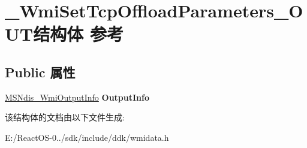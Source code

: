 \hypertarget{struct___wmi_set_tcp_offload_parameters___o_u_t}{}\section{\+\_\+\+Wmi\+Set\+Tcp\+Offload\+Parameters\+\_\+\+O\+U\+T结构体 参考}
\label{struct___wmi_set_tcp_offload_parameters___o_u_t}
\subsection*{Public 属性}
\begin{DoxyCompactItemize}
\item 
\mbox{\label{struct___wmi_set_tcp_offload_parameters___o_u_t_ad6c9cbfb306f907a772034d12b4d1cfc}} 
\hyperlink{struct___m_s_ndis___wmi_output_info}{M\+S\+Ndis\+\_\+\+Wmi\+Output\+Info} {\bfseries Output\+Info}
\end{DoxyCompactItemize}


该结构体的文档由以下文件生成\+:\begin{DoxyCompactItemize}
\item 
E\+:/\+React\+O\+S-\/0../sdk/include/ddk/wmidata.\+h\end{DoxyCompactItemize}
